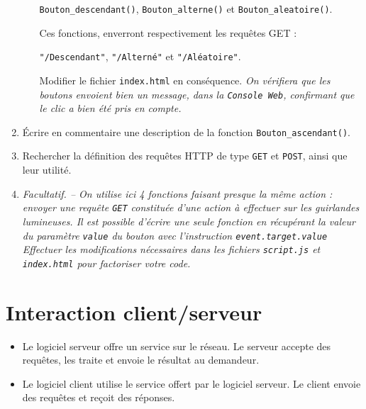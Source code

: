 \documentclass[a4paper]{article}
\begin{document}
\begin{enumerate}
\begin{enumerate}
	\begin{center}\texttt{Bouton_descendant()}, \texttt{Bouton_alterne()} et \texttt{Bouton_aleatoire()}. 
	\end{center}

	Ces fonctions, enverront respectivement les requêtes GET :

	\begin{center}
	  \texttt{"/Descendant"}, \texttt{"/Alterné"} et \texttt{"/Aléatoire"}.
	\end{center}

	Modifier le fichier \verb|index.html| en conséquence. {\itshape On vérifiera que les boutons envoient bien un message, dans la \verb|Console Web|, confirmant que le clic a bien été pris en compte.}
    \end{enumerate}
  \item Écrire en commentaire une description de la fonction \texttt{Bouton_ascendant()}.
\item Rechercher la définition des requêtes HTTP de type \verb|GET| et \verb|POST|, ainsi que leur utilité.
\item {\itshape Facultatif. -- On utilise ici 4 fonctions faisant presque la même action : envoyer une requête \verb|GET| constituée d'une action à effectuer sur les guirlandes lumineuses.
  Il est possible d'écrire une seule fonction en récupérant la valeur du paramètre \texttt{value} du bouton avec l'instruction \texttt{event.target.value}\\
Effectuer les modifications nécessaires dans les fichiers \verb|script.js| et \verb|index.html| pour \og{}factoriser\fg{} votre code.}
\end{enumerate}

\pagebreak

\section{Interaction client/serveur}

\begin{itemize}
\item Le logiciel serveur offre un service sur le réseau. Le serveur accepte des requêtes, les traite et envoie le résultat au demandeur.
\item Le logiciel client utilise le service offert par le logiciel serveur. Le client envoie des requêtes et reçoit des réponses.
\end{itemize}
\end{document}

